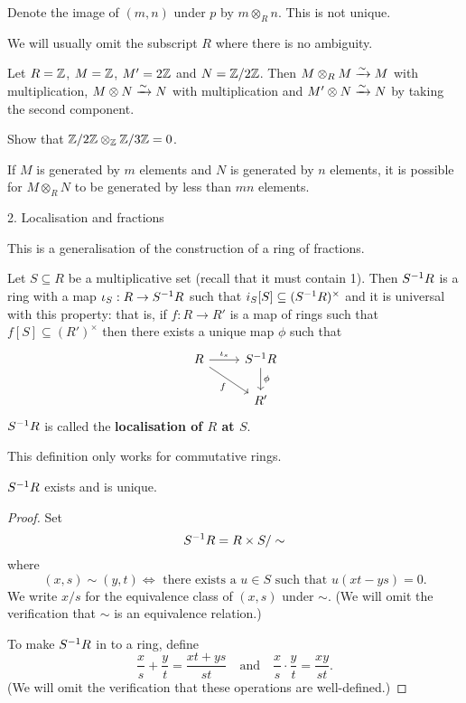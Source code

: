 \begin{rmk}
	\leavevmode
	\begin{enum}
		\io
		Denote the image of $(m,n)$ under $p$ by $m \otimes_R n$.
		This is not unique.
		
		\io
		We will usually omit the subscript $R$ where there is no ambiguity.
	\end{enum}
\end{rmk}

\begin{exam}
	Let $R=\mathbb{Z}$, $M=\mathbb{Z}$, $M'=2\mathbb{Z}$ and $N=\mathbb{Z}/2\mathbb{Z}$.
	Then $M \otimes_R M \xrightarrow{\sim} M$ with multiplication, $M \otimes N \xrightarrow{\sim} N$ with multiplication and $M' \otimes N \xrightarrow{\sim} N$ by taking the second component.
\end{exam}

\begin{exer}
	Show that $\mathbb{Z}/2\mathbb{Z} \otimes_{\mathbb{Z}} \mathbb{Z}/3\mathbb{Z} = 0$.
\end{exer}

\begin{rmk}
	If $M$ is generated by $m$ elements and $N$ is generated by $n$ elements, it is possible for $M \otimes_R N$ to be generated by less than $mn$ elements.
\end{rmk}

2. Localisation and fractions

This is a generalisation of the construction of a ring of fractions.

\begin{defn}[2.1]
	Let $S \subseteq R$ be a multiplicative set (recall that it must contain 1).
	Then $S^{-1} R$ is a ring with a map $\iota_S: R \to S^{-1} R$ such that $i_S[S] \subseteq (S^{-1} R)^\times$ and it is universal with this property: that is, if $f: R \to R'$ is a map of rings such that $f[S] \subseteq (R')^\times$ then there exists a unique map $\phi$ such that
	\[\begin{tikzcd}
		R \ar[r, "\iota_s"] \ar[rd, "f", swap] & S\inv R \ar[d, "\phi"] \\
		& R'
	\end{tikzcd}\]
	$S^{-1} R$ is called the \textbf{localisation of $R$ at $S$}.
\end{defn}

\begin{rmk}
	This definition only works for commutative rings.
\end{rmk}

\begin{prop}[2.22]
	$S^{-1} R$ exists and is unique.
\end{prop}

\begin{proof}
	Set
	\[S^{-1} R = R \times S/\sim\]
	where
	\[(x,s)\sim(y,t) \iff \text{ there exists a } u \in S \text{ such that } u(xt-ys)=0.\]
	We write $x/s$ for the equivalence class of $(x,s)$ under $\sim$.
	(We will omit the verification that $\sim$ is an equivalence relation.)
	
	To make $S^{-1} R$ in to a ring, define
	\[\frac xs + \frac yt = \frac{xt+ys}{st} \quad \text{and} \quad \frac xs \cdot \frac yt = \frac{xy}{st}.\]
	(We will omit the verification that these operations are well-defined.)
\end{proof}